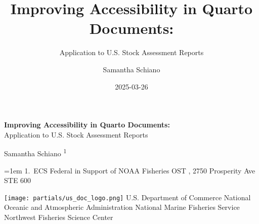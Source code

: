 \documentclass[
]{scrartcl}
\title{Improving Accessibility in Quarto Documents:}
\subtitle{Application to U.S. Stock Assessment Reports}
\author{Samantha Schiano}
\date{2025-03-26}
\begin{document}
  \begin{titlepage}

  \begin{minipage}[b][\textheight][s]{\textwidth}
  \raggedright




  {\huge\bfseries\nohyphens{Improving Accessibility in Quarto
  Documents:}}\\[1\baselineskip]
  {\large{Application to U.S. Stock Assessment
  Reports}}\\[4\baselineskip]

  \vspace{1\baselineskip}


  \vspace{1\baselineskip}

  {\large{Samantha Schiano}}%
  {\textsuperscript{1}}%



  \vspace{2\baselineskip}

  \hangindent=1em
  {1}.~{ECS Federal in Support of NOAA Fisheries OST}%
  , %
  {2750 Prosperity Ave STE 600}%


  \vspace{1\baselineskip}



  \vfill


  \vspace{1\baselineskip}

  \texttt{[image: partials/us\_doc\_logo.png]}\newline
  U.S. Department of Commerce\newline
  National Oceanic and Atmospheric Administration\newline
  National Marine Fisheries Service\newline
  Northwest Fisheries Science Center\newline

  \end{minipage}
  \restoregeometry
  \end{titlepage}
\end{document}
